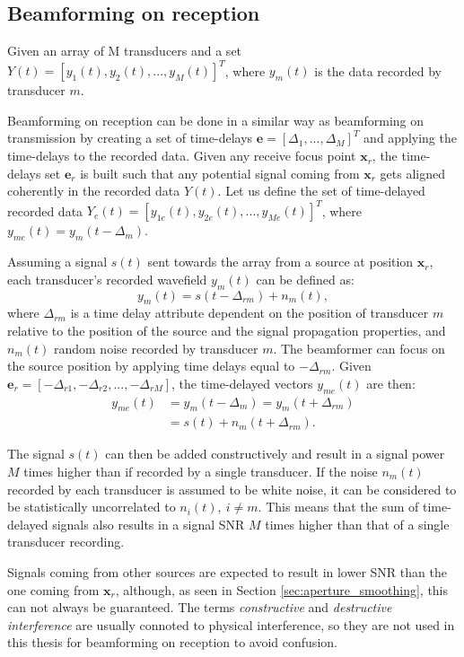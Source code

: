 \subsection{Beamforming on reception}
\label{sec:beamforming_reception}
Given an array of M transducers and a set $Y(t) = [y_1(t), y_2(t), ..., y_M(t)]^T$, where $y_m(t)$ is the data recorded by transducer $m$.

Beamforming on reception can be done in a similar way as beamforming on transmission by creating a set of time-delays $\boldsymbol{e} = [\Delta_1, ..., \Delta_M]^T$ and applying the time-delays to the recorded data. Given any receive focus point $\boldsymbol{x}_r$, the time-delays set $\boldsymbol{e}_r$ is built such that any potential signal coming from $\boldsymbol{x}_r$ gets aligned coherently in the recorded data $Y(t)$.
Let us define the set of time-delayed recorded data $Y_e(t) = [y_{1e}(t), y_{2e}(t), ..., y_{Me}(t)]^T$, where $y_{me}(t) = y_m(t - \Delta_m)$.

Assuming a signal $s(t)$ sent towards the array from a source at position $\boldsymbol{x}_r$, each transducer's recorded wavefield $y_m(t)$ can be defined as:
\begin{equation}
    y_m(t) = s(t - \Delta_{rm}) + n_m(t),
\end{equation}
\noindent
where $\Delta_{rm}$ is a time delay attribute dependent on the position of transducer $m$ relative to the position of the source and the signal propagation properties, and $n_m(t)$ random noise recorded by transducer $m$.
The beamformer can focus on the source position by applying time delays equal to $-\Delta_{rm}$. Given $\boldsymbol{e}_r = [-\Delta_{r1}, -\Delta_{r2}, ..., -\Delta_{rM}]$, the time-delayed vectors $y_{me}(t)$ are then:
\begin{align}
    y_{me}(t) &= y_m(t - \Delta_m) = y_m(t + \Delta_{rm}) \nonumber \\
    &= s(t) + n_m(t + \Delta_{rm}).
\end{align}

The signal $s(t)$ can then be added constructively and result in a signal power $M$ times higher than if recorded by a single transducer. If the noise $n_m(t)$ recorded by each transducer is assumed to be white noise, it can be considered to be statistically uncorrelated to $n_i(t),~i \neq m$. This means that the sum of time-delayed signals also results in a signal SNR $M$ times higher than that of a single transducer recording.

Signals coming from other sources are expected to result in lower SNR than the one coming from $\boldsymbol{x}_r$, although, as seen in Section \ref{sec:aperture_smoothing}, this can not always be guaranteed.
The terms \textit{constructive} and \textit{destructive interference} are usually connoted to physical interference, so they are not used in this thesis for beamforming on reception to avoid confusion.


